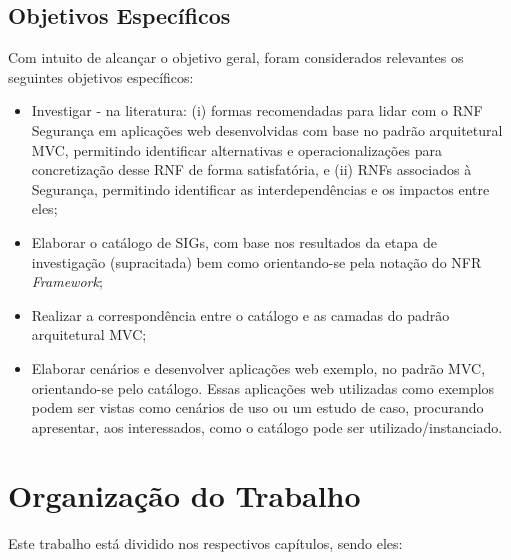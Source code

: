 \subsection{Objetivos Específicos}

Com intuito de alcançar o objetivo geral, foram considerados relevantes os seguintes objetivos específicos:

\begin{itemize}
	
	\item Investigar - na literatura: (i) formas recomendadas para lidar com o RNF Segurança em aplicações web desenvolvidas com base no padrão arquitetural MVC, permitindo identificar alternativas e operacionalizações para concretização desse RNF de forma satisfatória, e (ii) RNFs associados à Segurança, permitindo identificar as interdependências e os impactos entre eles;
	
	\item Elaborar o catálogo de SIGs, com base nos resultados da etapa de investigação (supracitada) bem como orientando-se pela notação do NFR \textit{Framework};
	
	\item Realizar a correspondência entre o  catálogo e as camadas do padrão arquitetural MVC;
	
	
	\item Elaborar cenários e desenvolver aplicações web exemplo, no padrão MVC, orientando-se pelo catálogo. Essas aplicações web utilizadas como exemplos podem ser vistas como cenários de uso ou um estudo de caso, procurando apresentar, aos interessados, como o catálogo pode ser utilizado/instanciado. 
	
\end{itemize}

\section{Organização do Trabalho}

Este trabalho está dividido nos respectivos capítulos, sendo eles:
 
